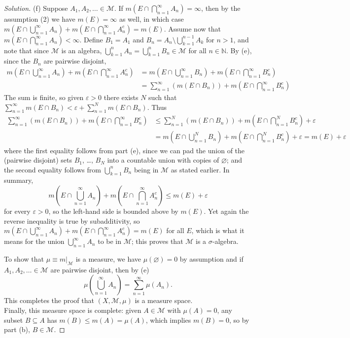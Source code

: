 \documentclass[10pt]{article}
\providecommand{\eps}{\varepsilon}
\providecommand{\NN}{\mathbb N}
\newenvironment{soln}{\begin{proof}[Solution]}{\end{proof}}
\begin{document}
\begin{soln}
    (f) Suppose $A_1,A_2,\ldots\in\mathcal M$.
    If $m(E\cap\bigcap_{n=1}^\infty A_n) = \infty$, then
    by the assumption (2) we have $m(E) = \infty$ as well,
    in which case
    $m(E\cap\bigcup_{n=1}^\infty A_n) + m(E\cap\bigcap_{n=1}^\infty A_n^c) = m(E)$.
    Assume now that $m(E\cap\bigcap_{n=1}^\infty A_n) < \infty$.
    Define $B_1 = A_1$ and $B_n = A_n\setminus\bigcup_{k=1}^{n-1}A_k$ for $n>1$,
    and note that since $\mathcal M$ is an algebra,
    $\bigcup_{k=1}^n A_n = \bigcup_{k=1}^n B_n\in\mathcal M$ for all $n\in\NN$.
    By (e), since the $B_n$ are pairwise disjoint,
    \begin{align*}
	m\left(E\cap\bigcup_{n=1}^\infty A_n\right) +
	m\left(E\cap\bigcap_{n=1}^\infty A_n^c\right)
	&= m\left(E\cap\bigcup_{n=1}^\infty B_n\right) +
	m\left(E\cap\bigcap_{n=1}^\infty B_n^c\right)\\
	&= \sum_{n=1}^\infty (m(E\cap B_n)) +
	m\left(E\cap\bigcap_{n=1}^\infty B_n^c\right)
    \end{align*}
    The sum is finite, so given $\eps>0$
    there exists $N$ such that
    $\sum_{n=1}^\infty m(E\cap B_n) < \eps+\sum_{n=1}^N m(E\cap B_n)$.
    Thus
    \begin{align*}
	\sum_{n=1}^\infty (m(E\cap B_n)) +
	m\left(E\cap\bigcap_{n=1}^\infty B_n^c\right)
	&\le \sum_{n=1}^N (m(E\cap B_n)) +
	m\left(E\cap\bigcap_{n=1}^N B_n^c\right) + \eps\\
	&= m\left(E\cap\bigcup_{n=1}^N B_n\right) +
	m\left(E\cap\bigcap_{n=1}^N B_n^c\right) + \eps = m(E) + \eps
    \end{align*}
    where the first equality follows from part (e),
    since we can pad the union of the (pairwise disjoint) sets
    $B_1$, \dots, $B_N$ into a countable union with copies of $\varnothing$;
    and the second equality follows from $\bigcup_{k=1}^n B_n$
    being in $\mathcal M$ as stated earlier. In summary,
    \begin{equation*}
	m\left(E\cap\bigcup_{n=1}^\infty A_n\right) +
	m\left(E\cap\bigcap_{n=1}^\infty A_n^c\right)
	\le m(E) + \eps
    \end{equation*}
    for every $\eps>0$, so the left-hand side is bounded above by $m(E)$.
    Yet again the reverse inequality is true by subadditivity, so
    $m(E\cap\bigcup_{n=1}^\infty A_n) + m(E\cap\bigcap_{n=1}^\infty A_n^c)
    = m(E)$ for all $E$, which is what it means for
    the union $\bigcup_{n=1}^\infty A_n$ to be in $\mathcal M$;
    this proves that $\mathcal M$ is a $\sigma$-algebra.

    To show that $\mu \equiv m|_{\mathcal M}$ is a measure,
    we have $\mu(\varnothing) = 0$ by assumption and
    if $A_1,A_2,\ldots\in\mathcal M$ are pairwise disjoint, then by (e)
    \begin{equation*}
	\mu\left(\bigcup_{n=1}^\infty A_n\right) =
	\sum_{n=1}^\infty \mu(A_n).
    \end{equation*}
    This completes the proof that $(X,\mathcal M, \mu)$ is a measure space.\\

    Finally, this measure space is complete:
    given $A\in\mathcal M$ with $\mu(A) = 0$, any subset
    $B\subseteq A$ has $m(B)\le m(A) = \mu(A)$,
    which implies $m(B) = 0$, so by part (b), $B\in\mathcal M$.
\end{soln}
\end{document}
